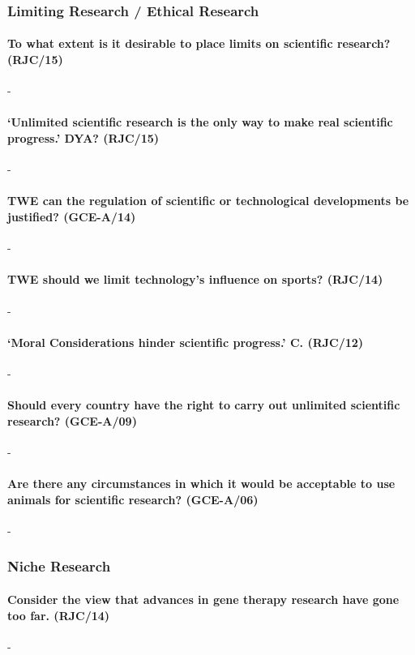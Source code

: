 \documentclass[../../main]{subfiles}
\begin{document}
\subsubsection{Limiting Research / Ethical Research}

\paragraph{To what extent is it desirable to place limits on scientific research? (RJC/15)}-

\paragraph{`Unlimited scientific research is the only way to make real scientific progress.' DYA? (RJC/15)}-

\paragraph{TWE can the regulation of scientific or technological developments be justified? (GCE-A/14)}-

\paragraph{TWE should we limit technology's influence on sports? (RJC/14)}-

\paragraph{`Moral Considerations hinder scientific progress.' C. (RJC/12)}-

\paragraph{Should every country have the right to carry out unlimited scientific research? (GCE-A/09)}-

\paragraph{Are there any circumstances in which it would be acceptable to use animals for scientific research? (GCE-A/06)}-

\subsubsection{Niche Research}

\paragraph{Consider the view that advances in gene therapy research have gone too far. (RJC/14)}-
\end{document}
